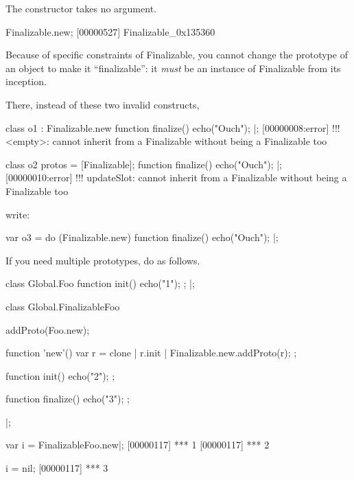 The constructor takes no argument.

\begin{urbiscript}
Finalizable.new;
[00000527] Finalizable_0x135360
\end{urbiscript}

\bigskip

Because of specific constraints of Finalizable, you cannot change the
prototype of an object to make it ``finalizable'': it \emph{must} be an
instance of Finalizable from its inception.

There, instead of these two invalid constructs,

\begin{multicols}{2}
\begin{urbiscript}
class o1 : Finalizable.new
{
  function finalize()
  {
    echo("Ouch");
  }
}|;
[00000008:error] !!! <empty>: cannot inherit from a Finalizable without being a Finalizable too
\end{urbiscript}

\begin{urbiscript}
class o2
{
  protos = [Finalizable];
  function finalize()
  {
    echo("Ouch");
  }
}|;
[00000010:error] !!! updateSlot: cannot inherit from a Finalizable without being a Finalizable too
\end{urbiscript}
\end{multicols}

write:

\begin{urbiscript}
var o3 =
  do (Finalizable.new)
  {
    function finalize()
    {
      echo("Ouch");
    }
  }|;
\end{urbiscript}

\bigskip

If you need multiple prototypes, do as follows.

\begin{urbiscript}
class Global.Foo
{
  function init()
  {
    echo("1");
  };
}|;

class Global.FinalizableFoo
{
  addProto(Foo.new);

  function 'new'()
  {
    var r = clone |
    r.init |
    Finalizable.new.addProto(r);
  };

  function init()
  {
    echo("2");
  };

  function finalize()
  {
    echo("3");
  };

}|;

var i = FinalizableFoo.new|;
[00000117] *** 1
[00000117] *** 2

i = nil;
[00000117] *** 3
\end{urbiscript}



